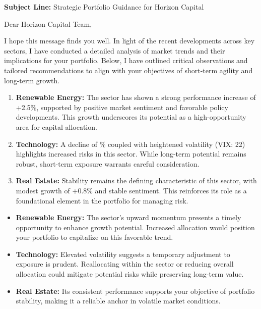 \documentclass[11pt]{article}
\begin{document}
\begin{tcolorbox}[enhanced, colback=boxgray, frame hidden, arc=2mm,
    left=5mm, right=5mm, top=4mm, bottom=4mm, breakable]
\textbf{Subject Line:} Strategic Portfolio Guidance for Horizon Capital

\medskip
Dear Horizon Capital Team,

I hope this message finds you well. In light of the recent developments across
key sectors, I have conducted a detailed analysis of market trends and their
implications for your portfolio. Below, I have outlined critical observations
and tailored recommendations to align with your objectives of short-term
agility and long-term growth.

\begin{enumerate}[leftmargin=1.5em, itemsep=2pt]
  \item \textbf{Renewable Energy:} The sector has shown a strong performance
  increase of +2.5\%, supported by positive market sentiment and favorable
  policy developments. This growth underscores its potential as a
  high-opportunity area for capital allocation.
  \item \textbf{Technology:} A decline of \% coupled with
  heightened volatility (VIX: 22) highlights increased risks in this sector.
  While long-term potential remains robust, short-term exposure warrants
  careful consideration.
  \item \textbf{Real Estate:} Stability remains the defining characteristic of
  this sector, with modest growth of +0.8\% and stable sentiment. This
  reinforces its role as a foundational element in the portfolio for managing
  risk.
\end{enumerate}

\begin{itemize}[leftmargin=1.5em, itemsep=2pt]
  \item \textbf{Renewable Energy:} The sector's upward momentum presents a
  timely opportunity to enhance growth potential. Increased allocation would
  position your portfolio to capitalize on this favorable trend.
  \item \textbf{Technology:} Elevated volatility suggests a temporary
  adjustment to exposure is prudent. Reallocating within the sector or
  reducing overall allocation could mitigate potential risks while preserving
  long-term value.
  \item \textbf{Real Estate:} Its consistent performance supports your
  objective of portfolio stability, making it a reliable anchor in volatile
  market conditions.
\end{itemize}


\end{tcolorbox}
\end{document}
